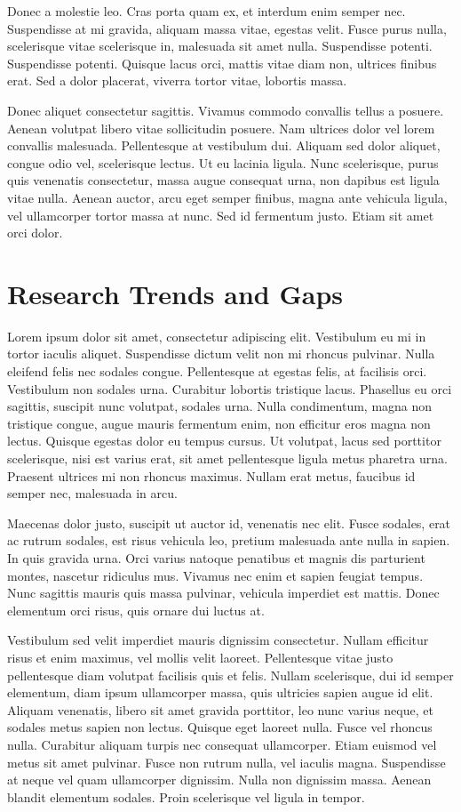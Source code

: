 Donec a molestie leo. Cras porta quam ex, et interdum enim semper nec. Suspendisse at mi gravida, aliquam massa vitae, egestas velit. Fusce purus nulla, scelerisque vitae scelerisque in, malesuada sit amet nulla. Suspendisse potenti. Suspendisse potenti. Quisque lacus orci, mattis vitae diam non, ultrices finibus erat. Sed a dolor placerat, viverra tortor vitae, lobortis massa.

Donec aliquet consectetur sagittis. Vivamus commodo convallis tellus a posuere. Aenean volutpat libero vitae sollicitudin posuere. Nam ultrices dolor vel lorem convallis malesuada. Pellentesque at vestibulum dui. Aliquam sed dolor aliquet, congue odio vel, scelerisque lectus. Ut eu lacinia ligula. Nunc scelerisque, purus quis venenatis consectetur, massa augue consequat urna, non dapibus est ligula vitae nulla. Aenean auctor, arcu eget semper finibus, magna ante vehicula ligula, vel ullamcorper tortor massa at nunc. Sed id fermentum justo. Etiam sit amet orci dolor.



\section{Research Trends and Gaps}
\label{chap:LitGaps}
Lorem ipsum dolor sit amet, consectetur adipiscing elit. Vestibulum eu mi in tortor iaculis aliquet. Suspendisse dictum velit non mi rhoncus pulvinar. Nulla eleifend felis nec sodales congue. Pellentesque at egestas felis, at facilisis orci. Vestibulum non sodales urna. Curabitur lobortis tristique lacus. Phasellus eu orci sagittis, suscipit nunc volutpat, sodales urna. Nulla condimentum, magna non tristique congue, augue mauris fermentum enim, non efficitur eros magna non lectus. Quisque egestas dolor eu tempus cursus. Ut volutpat, lacus sed porttitor scelerisque, nisi est varius erat, sit amet pellentesque ligula metus pharetra urna. Praesent ultrices mi non rhoncus maximus. Nullam erat metus, faucibus id semper nec, malesuada in arcu.

Maecenas dolor justo, suscipit ut auctor id, venenatis nec elit. Fusce sodales, erat ac rutrum sodales, est risus vehicula leo, pretium malesuada ante nulla in sapien. In quis gravida urna. Orci varius natoque penatibus et magnis dis parturient montes, nascetur ridiculus mus. Vivamus nec enim et sapien feugiat tempus. Nunc sagittis mauris quis massa pulvinar, vehicula imperdiet est mattis. Donec elementum orci risus, quis ornare dui luctus at.

Vestibulum sed velit imperdiet mauris dignissim consectetur. Nullam efficitur risus et enim maximus, vel mollis velit laoreet. Pellentesque vitae justo pellentesque diam volutpat facilisis quis et felis. Nullam scelerisque, dui id semper elementum, diam ipsum ullamcorper massa, quis ultricies sapien augue id elit. Aliquam venenatis, libero sit amet gravida porttitor, leo nunc varius neque, et sodales metus sapien non lectus. Quisque eget laoreet nulla. Fusce vel rhoncus nulla. Curabitur aliquam turpis nec consequat ullamcorper. Etiam euismod vel metus sit amet pulvinar. Fusce non rutrum nulla, vel iaculis magna. Suspendisse at neque vel quam ullamcorper dignissim. Nulla non dignissim massa. Aenean blandit elementum sodales. Proin scelerisque vel ligula in tempor.


